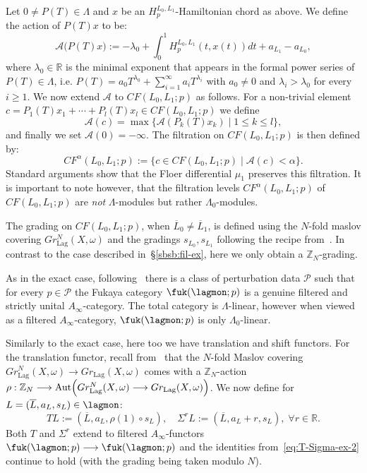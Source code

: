 Let $0 \neq P(T) \in \Lambda$ and $x$ be an
$H^{L_0,L_1}_p$-Hamiltonian chord as above. We define the action of
$P(T)x$ to be:
\begin{equation} \label{eq:action-mon} \mathcal{A}\bigl(P(T)x\bigr) :=
  -\lambda_0 + \int_0^1 H_p^{L_0,L_1}(t, x(t))dt + a_{L_1} - a_{L_0},
\end{equation}
where $\lambda_0 \in \mathbb{R}$ is the minimal exponent that appears
in the formal power series of $P(T) \in \Lambda$, i.e.
$P(T) = a_0 T^{\lambda_0} + \sum_{i=1}^{\infty} a_i T^{\lambda_i}$
with $a_0 \neq 0$ and $\lambda_i > \lambda_0$ for every $i\geq 1$.  We
now extend $\mathcal{A}$ to $CF(L_0,L_1;p)$ as follows. For a
non-trivial element
$c = P_1(T)x_1 + \cdots + P_l(T)x_l \in CF(L_0, L_1;p)$ we define
$$\mathcal{A}(c) = \max \{ \mathcal{A}(P_k(T) x_k) \mid 1\leq k \leq
l\},$$ and finally we set $\mathcal{A}(0) = -\infty$. The filtration
on $CF(L_0,L_1;p)$ is then defined by:
$$CF^{\alpha}(L_0,L_1;p) := 
\{c \in CF(L_0,L_1; p) \mid \mathcal{A}(c) < \alpha \}.$$ Standard
arguments show that the Floer differential $\mu_1$ preserves this
filtration. It is important to note however, that the filtration
levels $CF^{\alpha}(L_0,L_1;p)$ of $CF(L_0,L_1;p)$ are {\em not}
$\Lambda$-modules but rather $\Lambda_0$-modules.

The grading on $CF(L_0, L_1;p)$, when
$\overline{L}_0 \neq \overline{L}_1$, is defined using the $N$-fold
maslov covering $Gr^N_{\text{Lag}}(X, \omega)$ and the gradings
$s_{L_0}, s_{L_1}$ following the recipe from~\cite{Se:graded}. In
contrast to the case described in~\S\ref{sbsb:fil-ex}, here we only
obtain a $\mathbb{Z}_N$-grading.

As in the exact case, following~\cite{Amb:fil-fuk} there is a class of
perturbation data $\mathcal{P}$ such that for every
$p \in \mathcal{P}$ the Fukaya category $\fuk(\lagmon;p)$ is a genuine
filtered and strictly unital $A_{\infty}$-category. The total category
is $\Lambda$-linear, however when viewed as a filtered
$A_{\infty}$-category, $\fuk(\lagmon;p)$ is only $\Lambda_0$-linear.

Similarly to the exact case, here too we have translation and shift
functors. For the translation functor, recall from~\cite{Se:graded} that the $N$-fold
Maslov covering
$Gr^N_{\text{Lag}}(X, \omega) \longrightarrow Gr_{\text{Lag}}(X,
\omega)$ comes with a $\mathbb{Z}_N$-action
$\rho: \mathbb{Z}_N \longrightarrow
\text{Aut}\Bigl(Gr^N_{\text{Lag}}(X, \omega) \longrightarrow
Gr_{\text{Lag}}(X, \omega) \Bigr)$.  We now
define for $L = (\overline{L}, a_L, s_L) \in \lagmon$:
\begin{equation} \label{eq:T-Sigma-mon-1} TL := (\overline{L}, a_L,
  \rho(1) \circ s_L), \quad \Sigma^r L := (\overline{L}, a_L+r, s_L),
  \; \forall r \in \mathbb{R}.
\end{equation}
Both $T$ and $\Sigma^r$ extend to filtered $A_{\infty}$-functors
$\fuk(\lagmon;p) \longrightarrow \fuk(\lagmon;p)$ and the identities
from~\eqref{eq:T-Sigma-ex-2} continue to hold (with the grading being
taken modulo $N$).


